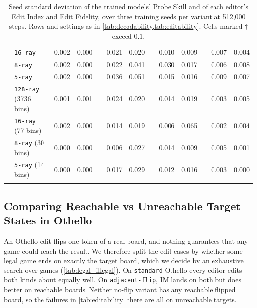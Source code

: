 \documentclass{article} %
\begin{document}
\begin{table}[ht]
\begin{tabular}{ll rr G rr G rr G rr}
& \texttt{16-ray}   & 0.002 & 0.000 & & 0.021 & 0.020 & & 0.010 & 0.009 & & 0.007 & 0.004 \\
& \texttt{8-ray}    & 0.002 & 0.000 & & 0.022 & 0.041 & & 0.030 & 0.017 & & 0.006 & 0.008 \\
& \texttt{5-ray}    & 0.002 & 0.000 & & 0.036 & 0.051 & & 0.015 & 0.016 & & 0.009 & 0.007 \\
\noalign{\vspace{0.1em}}
& \texttt{128-ray} (3736 bins) & 0.001 & 0.001 & & 0.024 & 0.020 & & 0.014 & 0.019 & & 0.003 & 0.005 \\
& \texttt{16-ray} (77 bins)    & 0.002 & 0.000 & & 0.014 & 0.019 & & 0.006 & 0.065 & & 0.002 & 0.004 \\
& \texttt{8-ray} (30 bins)     & 0.000 & 0.000 & & 0.006 & 0.027 & & 0.014 & 0.009 & & 0.005 & 0.001 \\
& \texttt{5-ray} (14 bins)     & 0.000 & 0.000 & & 0.017 & 0.029 & & 0.012 & 0.016 & & 0.003 & 0.000 \\
\noalign{\vspace{0.75em}}
\hline
\end{tabular}
\caption{Seed standard deviation of the trained models' Probe Skill and of each editor's Edit Index and Edit Fidelity, over three training seeds per variant at 512,000 steps. Rows and settings as in \cref{tab:decodability,tab:editability}. Cells marked $\dagger$ exceed $0.1$.}
\label{tab:seed_spread}
\end{table}


\FloatBarrier
\subsection{Comparing Reachable vs Unreachable Target States in Othello}
\label{app:legal_vs_illegal_othello}

An Othello edit flips one token of a real board, and nothing guarantees that any game could reach the result. We therefore split the edit cases by whether some legal game ends on exactly the target board, which we decide by an exhaustive search over games (\cref{tab:legal_illegal}). On \texttt{standard} Othello every editor edits both kinds about equally well. On \texttt{adjacent-flip}, IM lands on both but does better on reachable boards. Neither no-flip variant has any reachable flipped board, so the failures in \cref{tab:editability} there are all on unreachable targets.
\end{document}
